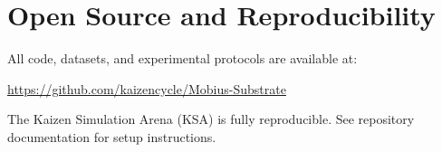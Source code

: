 \documentclass[11pt,letterpaper]{article}
\begin{document}
\section{Open Source and Reproducibility}
\label{app:opensource}

All code, datasets, and experimental protocols are available at:

\begin{center}
\url{https://github.com/kaizencycle/Mobius-Substrate}
\end{center}

The Kaizen Simulation Arena (KSA) is fully reproducible. See repository documentation for setup instructions.
\end{document}

